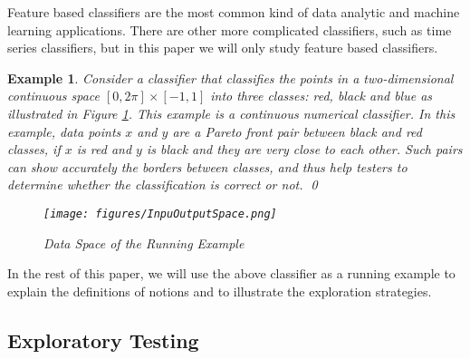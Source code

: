 \documentclass[preprint,1p,authoryear,times]{elsarticle}
\newtheorem{Definition}{Definition}
\newtheorem{Example}{Example}
\begin{document}
Feature based classifiers are the most common kind of data analytic and machine learning applications. There are other more complicated classifiers, such as time series classifiers, but in this paper we will only study feature based classifiers.
 
%
%
%

\begin{Example}\label{runningExample}
Consider a classifier that classifies the points in a two-dimensional continuous space $[0, 2\pi] \times [-1, 1]$ into three classes: \emph{red}, \emph{black} and \emph{blue} as illustrated in Figure \ref{fig:InputOutputSpace}. This example is a continuous numerical classifier. In this example, data points $x$ and $y$ are a Pareto front pair between \emph{black} and \emph{red} classes, if $x$ is \emph{red} and $y$ is \emph{black} and they are very close to each other. Such pairs can show accurately the borders between classes, and thus help testers to determine whether the classification is correct or not. \qed

\begin{figure}[htbp]
	\centering
	\texttt{[image: figures/InpuOutputSpace.png]}
	\caption{Data Space of the Running Example}
	\label{fig:InputOutputSpace}
\end{figure}
\end{Example}

In the rest of this paper, we will use the above classifier as a running example to explain the definitions of notions and to illustrate the exploration strategies. 

\subsection{Exploratory Testing}
\end{document}

